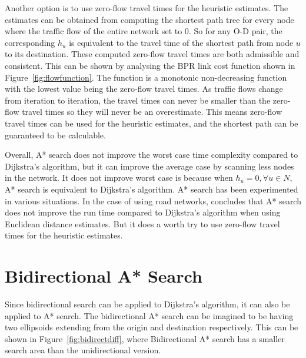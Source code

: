 Another option is to use zero-flow travel times for the heuristic estimates.
The estimates can be obtained from computing the shortest path tree for every node where the traffic flow of the entire network set to 0.
So for any O-D pair, the corresponding $h_u$ is equivalent to the travel time of the shortest path from node $u$ to its destination.
These computed zero-flow travel times are both admissible and consistent.
This can be shown by analysing the BPR link cost function shown in Figure~\ref{fig:flowfunction}.
The function is a monotonic non-decreasing function with the lowest value being the zero-flow travel times.
As traffic flows change from iteration to iteration,
the travel times can never be smaller than the zero-flow travel times so they will never be an overestimate.
This means zero-flow travel times can be used for the heuristic estimates, and the shortest path can be guaranteed to be calculable.

Overall, A* search does not improve the worst case time complexity compared to Dijkstra's algorithm,
but it can improve the average case by scanning less nodes in the network.
It does not improve worst case is because when $h_u = 0, \forall u \in N$, A* search is equivalent to Dijkstra's algorithm.
A* search has been experimented in various situations.
In the case of using road networks,
\citet{GoldbergLandmarks} concludes that A* search does not improve the run time compared to Dijkstra's algorithm when using Euclidean distance estimates.
But it does a worth try to use zero-flow travel times for the heuristic estimates.

\section{Bidirectional A* Search}
Since bidirectional search can be applied to Dijkstra's algorithm,
it can also be applied to A* search.
The bidirectional A* search can be imagined to be having two ellipsoids extending from the origin and destination respectively.
This can be shown in Figure~\ref{fig:bidirectdiff},
where Bidirectional A* search has a smaller search area than the unidirectional version.

